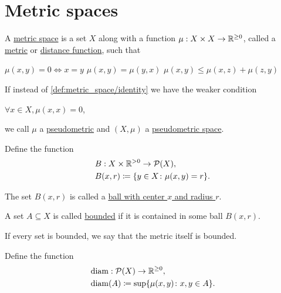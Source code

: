 \section{Metric spaces}\label{sec:metric_spaces}

\begin{definition}\label{def:metric_space}\cite[248]{Engelking1989}
  A \ul{metric space} is a set $X$ along with a function $\mu: X \times X \to \mathbb R^{\geq 0}$, called a \ul{metric} or \ul{distance function}, such that
  \begin{description}
     $\mu(x, y) = 0 \iff x = y$
     $\mu(x, y) = \mu(y, x)$
     $\mu(x, y) \leq \mu(x, z) + \mu(z, y)$
  \end{description}

  If instead of \ref{def:metric_space/identity} we have the weaker condition
  \begin{description}
     $\forall x \in X, \mu(x, x) = 0$,
  \end{description}
  we call $\mu$ a \ul{pseudometric} and $(X, \mu)$ a \ul{pseudometric space}.

  \begin{defenum}
    \item\label{def:metric_space/ball} Define the function
    \begin{align*}
      &B: X \times \mathbb R^{>0} \to \operatorname{\mathcal P}(X), \\
      &B(x, r) \coloneqq \{ y \in X \colon \mu(x, y) = r \}.
    \end{align*}

    The set $B(x, r)$ is called a \ul{ball with center $x$ and radius $r$}.

    \item\label{def:metric_space/bounded_set} A set $A \subseteq X$ is called \ul{bounded} if it is contained in some ball $B(x, r)$.

    \item\label{def:metric_space/bounded_metric} If every set is bounded, we say that the metric itself is bounded.

    \item\label{def:metric_space/diameter} Define the function
    \begin{align*}
      &\operatorname{diam}: \operatorname{\mathcal P}(X) \to \mathbb R^{\geq 0}, \\
      &\operatorname{diam}(A) \coloneqq \sup \{ \mu(x, y) \colon x, y \in A \}.
    \end{align*}


\end{defenum}
\end{definition}
